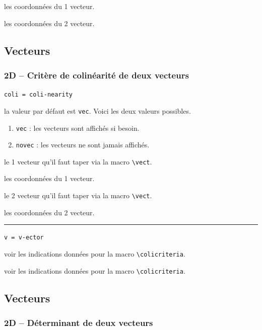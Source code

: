 \documentclass[12pt,a4paper]{book}
\newcommand\env[1]{\texttt{#1}}
\newcommand\macro[1]{\env{\textbackslash{}#1}}
\theoremstyle{definition}
\newcommand\separation{
	\medskip
	\hfill\rule{0.5\textwidth}{0.75pt}\hfill
	\medskip
}
\newcommand\mwhyprefix[2]{%
	\texttt{#1 = #1-#2}%
}
\begin{document}
{{ les coordonnées du 1\ier{} vecteur.

 les coordonnées du 2\ieme{} vecteur.


\subsection{Vecteurs}

\subsubsection{2D -- Critère de colinéarité de deux vecteurs}



 \hfill \mwhyprefix{coli}{nearity}


\IDoption{} la valeur par défaut est \verb+vec+. Voici les deux valeurs possibles.
\begin{enumerate}
	\item \verb+vec+ : les vecteurs sont affichés si besoin.

	\item \verb+novec+ : les vecteurs ne sont jamais affichés.
\end{enumerate}


 le 1\ier{} vecteur qu'il faut taper via la macro \macro{vect}.

 les coordonnées du 1\ier{} vecteur.

 le 2\ieme{} vecteur qu'il faut taper via la macro \macro{vect}.

 les coordonnées du 2\ieme{} vecteur.


\separation


 \hfill \mwhyprefix{v}{ector}


\IDoption{} voir les indications données pour la macro \macro{colicriteria}.

 voir les indications données pour la macro \macro{colicriteria}.


\subsection{Vecteurs}

\subsubsection{2D -- Déterminant de deux vecteurs} 



}}
\end{document}
